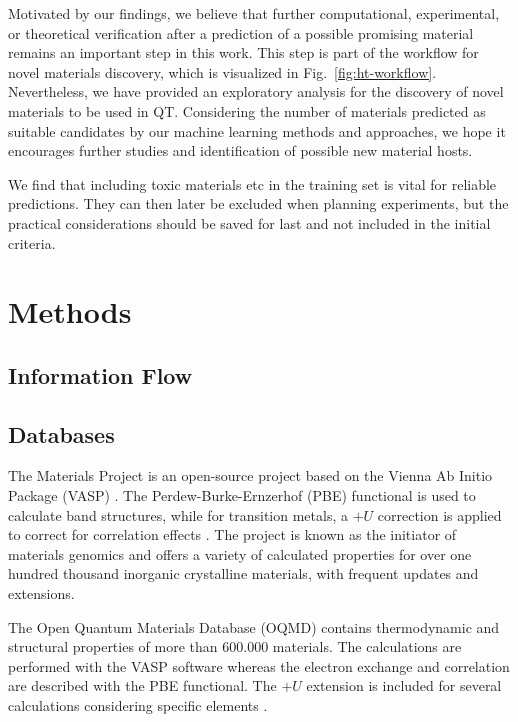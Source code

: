 \documentclass[superscriptaddress,unsortedaddress,
 amsmath,amssymb,
 aps,
]{revtex4-2}
\begin{document}

Motivated by our findings, we believe that further computational, experimental, or theoretical verification after a prediction of a possible promising material remains an important step in this work. This step is part of the workflow for novel materials discovery, which is visualized in Fig.~\ref{fig:ht-workflow}.  
Nevertheless, we have provided an exploratory analysis for the discovery of novel materials to be used in QT. Considering the number of materials predicted as suitable candidates by our machine learning methods and approaches, we hope it encourages further studies and identification of possible new material hosts. 

We find that including toxic materials etc in the training set is vital for reliable predictions. They can then later be excluded when planning experiments, but the practical considerations should be saved for last and not included in the initial criteria.  

\section*{Methods}

\subsection*{Information Flow}

\subsection*{Databases} %
The Materials Project \cite{Jain2013, Jain2018} is an open-source project based on the Vienna Ab Initio Package (VASP) \cite{Kresse1996}. The Perdew-Burke-Ernzerhof \cite{Perdew1996} (PBE) functional is used to calculate band structures, while for transition metals, a $+U$ correction is applied to correct for correlation effects \cite{Wang2006}. The project is known as the initiator of materials genomics and offers a variety of calculated properties for over one hundred thousand inorganic crystalline materials, with frequent updates and extensions. 

The Open Quantum Materials Database (OQMD) \cite{Saal2013, Kirklin2015} contains thermodynamic and structural properties of more than 600.000 materials. The calculations are performed with the VASP software whereas the electron exchange and correlation are described with the PBE functional. The $+U$ extension is included for several calculations considering specific elements \cite{Stevanovic2012}. 
\end{document}
